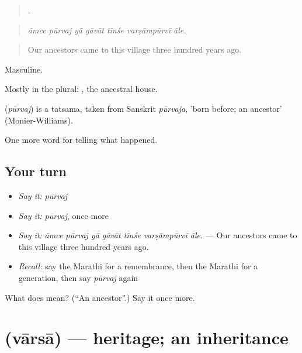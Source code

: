 \begin{quote}
      .
\end{quote}

\begin{quote}
\emph{āmce pūrvaj yā gāvāt tīnśe varṣāmpūrvī āle.}
\end{quote}

\begin{quote}
Our ancestors came to this village three hundred years ago.
\end{quote}

Masculine.

Mostly in the plural:  , the ancestral house.

\begin{cousinweb}
\textbf{} (\emph{pūrvaj}) is a tatsama, taken from Sanskrit \emph{pūrvaja}, 'born before; an ancestor' (Monier-Williams).
\end{cousinweb}

\begin{grammarlens}[title={What you've built}]
One more word for telling what happened.
\end{grammarlens}

\subsection*{Your turn}
\begin{itemize}
\raggedright
  \item \emph{Say it:} \emph{pūrvaj}
  \item \emph{Say it:} \emph{pūrvaj}, once more
  \item \emph{Say it:} \emph{āmce pūrvaj yā gāvāt tīnśe varṣāmpūrvī āle.} — Our ancestors came to this village three hundred years ago.
  \item \emph{Recall:} say the Marathi for a remembrance, then the Marathi for a generation, then say \emph{pūrvaj} again
\end{itemize}

\begin{tcolorbox}[breakable,colback=teal!4,colframe=teal!35!black,title={Before you move on}]
What does  mean? (\textquotedblleft{}An ancestor\textquotedblright{}.) Say it once more.
\end{tcolorbox}
\section[\texorpdfstring{\mr{वारसा} (vārsā)}{वारसा (vārsā)}]{ (vārsā) — heritage; an inheritance}

